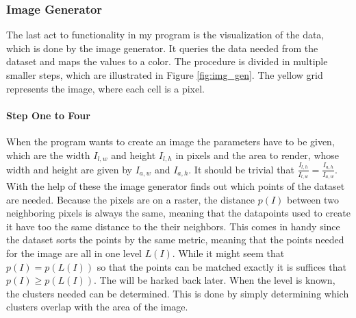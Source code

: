 \documentclass[12pt,a4paper,titlepage]{article}
\begin{document}
	\subsubsection{Image Generator}\label{sec:image_generation}
	The last act to functionality in my program is the visualization of the data, which is done by the image generator. It queries the data needed from the dataset and maps the values to a color. The procedure is divided in multiple smaller steps, which are illustrated in Figure \ref{fig:img_gen}. The yellow grid represents the image, where each cell is a pixel.
	\paragraph{Step One to Four}
	When the program wants to create an image the parameters have to be given, which are the width \(I_{l,w}\) and height \(I_{l,h}\) in pixels and the area to render, whose width and height are given by \(I_{a,w}\) and \(I_{a,h}\). It should be trivial that \(\frac{I_{l,h}}{I_{l,w}} = \frac{I_{a,h}}{I_{a,w}}\). With the help of these the image generator finds out which points of the dataset are needed. Because the pixels are on a raster, the distance \(p(I)\) between two neighboring pixels is always the same, meaning that the datapoints used to create it have too the same distance to the their neighbors. This comes in handy since the dataset sorts the points by the same metric, meaning that the points needed for the image are all in one level \(L(I)\). While it might seem that \(p(I) = p(L(I))\) so that the points can be matched exactly it is suffices that \(p(I) \geq p(L(I))\). The will be harked back later. When the level is known, the clusters needed can be determined. This is done by simply determining which clusters overlap with the area of the image.
\end{document}
